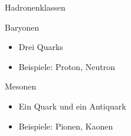 \documentclass[aspectratio=169]{beamer} %
\begin{document}
    \begin{frame}{Hadronenklassen}
        \begin{block}{Baryonen}
            \begin{itemize}
                \item Drei Quarks
                \item Beispiele: Proton, Neutron
            \end{itemize}
        \end{block}
        \begin{block}{Mesonen}
            \begin{itemize}
                \item Ein Quark und ein Antiquark
                \item Beispiele: Pionen, Kaonen
            \end{itemize}
        \end{block}
    \end{frame}
    
\end{document}
